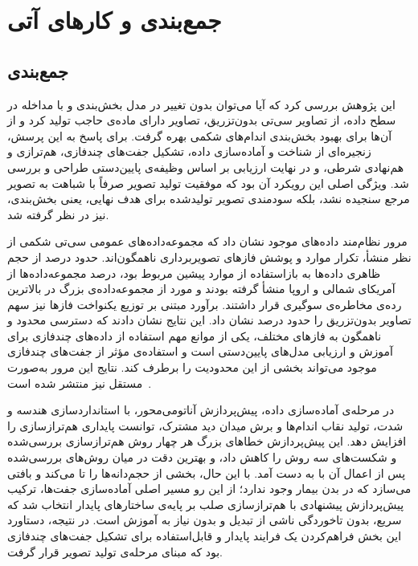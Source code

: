 \chapter{جمع‌بندی و کارهای آتی}

\label{chap:conclusions}

\section{جمع‌بندی}

\label{sec:c-path}

این پژوهش بررسی کرد که آیا می‌توان بدون تغییر در مدل بخش‌بندی و با مداخله در سطح داده، از تصاویر سی‌تی بدون‌تزریق، تصاویر دارای ماده‌ی حاجب تولید کرد و از آن‌ها برای بهبود بخش‌بندی اندام‌های شکمی بهره گرفت. برای پاسخ به این پرسش، زنجیره‌ای از شناخت و آماده‌سازی داده، تشکیل جفت‌های چندفازی، هم‌ترازی و هم‌نهادی شرطی، و در نهایت ارزیابی بر اساس وظیفه‌ی پایین‌دستی طراحی و بررسی شد. ویژگی اصلی این رویکرد آن بود که موفقیت تولید تصویر صرفاً با شباهت به تصویر مرجع سنجیده نشد، بلکه سودمندی تصویر تولیدشده برای هدف نهایی، یعنی بخش‌بندی، نیز در نظر گرفته شد.

مرور نظام‌مند داده‌های موجود نشان داد که مجموعه‌داده‌های عمومی سی‌تی شکمی از نظر منشأ، تکرار موارد و پوشش فازهای تصویربرداری ناهمگون‌اند. حدود  درصد از حجم ظاهری داده‌ها به بازاستفاده از موارد پیشین مربوط بود،  درصد مجموعه‌داده‌ها از آمریکای شمالی و اروپا منشأ گرفته بودند و  مورد از  مجموعه‌داده‌ی بزرگ در بالاترین رده‌ی مخاطره‌ی سوگیری قرار داشتند. برآورد مبتنی بر توزیع یکنواخت فازها نیز سهم تصاویر بدون‌تزریق را حدود  درصد نشان داد. این نتایج نشان دادند که دسترسی محدود و ناهمگون به فازهای مختلف، یکی از موانع مهم استفاده از داده‌های چندفازی برای آموزش و ارزیابی مدل‌های پایین‌دستی است و استفاده‌ی مؤثر از جفت‌های چندفازی موجود می‌تواند بخشی از این محدودیت را برطرف کند. نتایج این مرور به‌صورت مستقل نیز منتشر شده است~\cite{danaei2026abdomenctreview}.

در مرحله‌ی آماده‌سازی داده، پیش‌پردازش آناتومی‌محور، با استانداردسازی هندسه و شدت، تولید نقاب اندام‌ها و برش میدان دید مشترک، توانست پایداری هم‌ترازسازی را افزایش دهد. این پیش‌پردازش خطاهای بزرگ هر چهار روش هم‌ترازسازی بررسی‌شده و شکست‌های سه روش را کاهش داد، و بهترین دقت در میان روش‌های بررسی‌شده پس از اعمال آن با  به دست آمد. با این حال،  بخشی از حجم‌دانه‌ها را تا می‌کند و بافتی می‌سازد که در بدن بیمار وجود ندارد؛ از این رو مسیر اصلی آماده‌سازی جفت‌ها، ترکیب پیش‌پردازش پیشنهادی با هم‌ترازسازی صلب بر پایه‌ی ساختارهای پایدار انتخاب شد که سریع، بدون تاخوردگی ناشی از تبدیل و بدون نیاز به آموزش است. در نتیجه، دستاورد این بخش فراهم‌کردن یک فرایند پایدار و قابل‌استفاده برای تشکیل جفت‌های چندفازی بود که مبنای مرحله‌ی تولید تصویر قرار گرفت.

